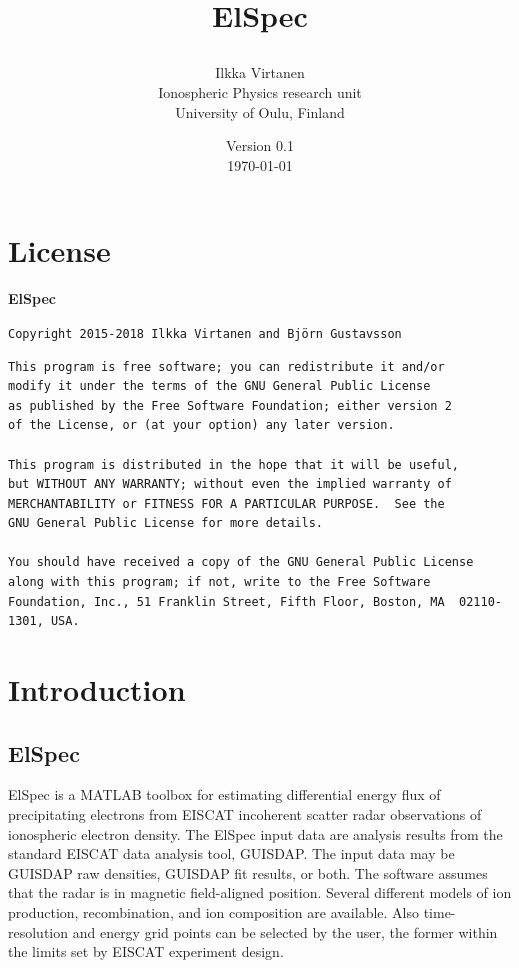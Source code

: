 \documentclass[12pt,a4paper]{report}
\title{ElSpec \\
\author{Ilkka Virtanen\\
Ionospheric Physics research unit\\ University of Oulu, Finland}
\date{Version 0.1 \\ \today}                                           %
}
\begin{document}
\sloppy

\maketitle



\newpage

\chapter*{License}
{\small

{\bfseries ElSpec}
\vspace*{6pt}

\noindent \texttt{Copyright 2015-2018 Ilkka Virtanen and Bj{\"o}rn Gustavsson}
\vspace*{6pt}

\begin{verbatim}
This program is free software; you can redistribute it and/or
modify it under the terms of the GNU General Public License
as published by the Free Software Foundation; either version 2
of the License, or (at your option) any later version.

This program is distributed in the hope that it will be useful,
but WITHOUT ANY WARRANTY; without even the implied warranty of	
MERCHANTABILITY or FITNESS FOR A PARTICULAR PURPOSE.  See the
GNU General Public License for more details.

You should have received a copy of the GNU General Public License
along with this program; if not, write to the Free Software
Foundation, Inc., 51 Franklin Street, Fifth Floor, Boston, MA  02110-1301, USA.
\end{verbatim}
}




\newpage


\tableofcontents

\newpage




\chapter{Introduction}

\section{ElSpec}

ElSpec is a MATLAB toolbox for estimating differential energy flux of precipitating electrons from EISCAT incoherent scatter radar observations of ionospheric electron density. The ElSpec input data are analysis results from the standard EISCAT data analysis tool, GUISDAP. The input data may be GUISDAP raw densities, GUISDAP fit results, or both. The software assumes that the radar is in magnetic field-aligned position. Several different models of ion production, recombination, and ion composition are available. Also time-resolution and energy grid points can be selected by the user, the former within the limits set by EISCAT experiment design. 
\end{document}
